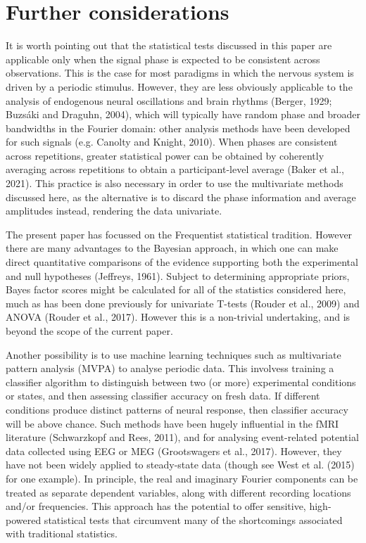 \documentclass[]{article}
\begin{document}
\hypertarget{further-considerations}{%
\section{Further considerations}\label{further-considerations}}

It is worth pointing out that the statistical tests discussed in this paper are applicable only when the signal phase is expected to be consistent across observations. This is the case for most paradigms in which the nervous system is driven by a periodic stimulus. However, they are less obviously applicable to the analysis of endogenous neural oscillations and brain rhythms (Berger, 1929; Buzsáki and Draguhn, 2004), which will typically have random phase and broader bandwidths in the Fourier domain: other analysis methods have been developed for such signals (e.g. Canolty and Knight, 2010). When phases are consistent across repetitions, greater statistical power can be obtained by coherently averaging across repetitions to obtain a participant-level average (Baker et al., 2021). This practice is also necessary in order to use the multivariate methods discussed here, as the alternative is to discard the phase information and average amplitudes instead, rendering the data univariate.

The present paper has focussed on the Frequentist statistical tradition. However there are many advantages to the Bayesian approach, in which one can make direct quantitative comparisons of the evidence supporting both the experimental and null hypotheses (Jeffreys, 1961). Subject to determining appropriate priors, Bayes factor scores might be calculated for all of the statistics considered here, much as has been done previously for univariate T-tests (Rouder et al., 2009) and ANOVA (Rouder et al., 2017). However this is a non-trivial undertaking, and is beyond the scope of the current paper.

Another possibility is to use machine learning techniques such as multivariate pattern analysis (MVPA) to analyse periodic data. This involvess training a classifier algorithm to distinguish between two (or more) experimental conditions or states, and then assessing classifier accuracy on fresh data. If different conditions produce distinct patterns of neural response, then classifier accuracy will be above chance. Such methods have been hugely influential in the fMRI literature (Schwarzkopf and Rees, 2011), and for analysing event-related potential data collected using EEG or MEG (Grootswagers et al., 2017). However, they have not been widely applied to steady-state data (though see West et al. (2015) for one example). In principle, the real and imaginary Fourier components can be treated as separate dependent variables, along with different recording locations and/or frequencies. This approach has the potential to offer sensitive, high-powered statistical tests that circumvent many of the shortcomings associated with traditional statistics.
\end{document}
